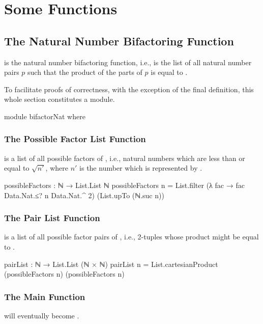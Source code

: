 \documentclass{report}
\begin{document}
\chapter{Some Functions}

\section{The Natural Number Bifactoring Function}
 is the natural number bifactoring function, i.e.,   is the list of all natural number pairs \(p\) such that the product of the parts of \(p\) is equal to .

To facilitate proofs of correctness, with the exception of the final definition, this whole section constitutes a module.

\begin{code}
module bifactorNat where
\end{code}

\subsection{The Possible Factor List Function}
  is a list of all possible factors of , i.e., natural numbers which are less than or equal to \(\sqrt{n\prime}\), where \(n\prime\) is the number which is represented by .

\begin{code}
  possibleFactors : ℕ → List.List ℕ
  possibleFactors n = List.filter (λ fac → fac Data.Nat.≤? n Data.Nat.^ 2)
                                  (List.upTo (ℕ.suc n))
\end{code}

\subsection{The Pair List Function}
  is a list of all possible factor pairs of , i.e., 2-tuples whose product might be equal to .

\begin{code}
  pairList : ℕ → List.List (ℕ × ℕ)
  pairList n = List.cartesianProduct (possibleFactors n) (possibleFactors n)
\end{code}

\subsection{The Main Function}\label{sec:bifactorNat-main}
 will eventually become .
\end{document}

